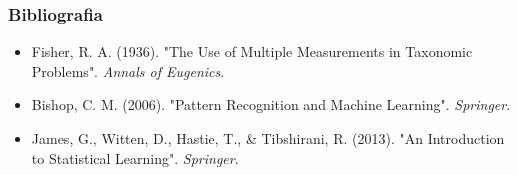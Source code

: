\documentclass{beamer}
\begin{document}
\begin{frame}
    \frametitle{Bibliografia}
    \begin{itemize}
        \item Fisher, R. A. (1936). "The Use of Multiple Measurements in Taxonomic Problems". \textit{Annals of Eugenics}.
        \item Bishop, C. M. (2006). "Pattern Recognition and Machine Learning". \textit{Springer}.
        \item James, G., Witten, D., Hastie, T., \& Tibshirani, R. (2013). "An Introduction to Statistical Learning". \textit{Springer}.
    \end{itemize}
\end{frame}
\end{document}
